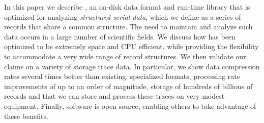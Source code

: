 In this paper we describe
\DataSeries{}, an on-disk data format and run-time library that is
optimized for analyzing \textit{structured serial data}, which we
define as a series of records that share a common
structure. The need to maintain and analyze such data occurs in a
large number of scientific fields.
We discuss how \DataSeries{} has been optimized to be extremely space and CPU
efficient, while providing the flexibility to accommodate a very wide
range of record structures. 
We then validate our claims on a variety of storage trace data. 
In particular, we show
data compression rates several times better than existing, specialized
formats, processing rate improvements of up to an order of
magnitude, storage of hundreds of billions of records and that
we can store and process these traces on very modest equipment.
Finally, \DataSeries{} software is open source,
enabling others to take advantage of these benefits.
